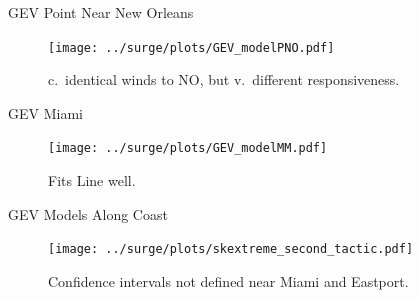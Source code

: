 \begin{frame}{GEV Point Near New Orleans}
\vspace{-20pt}
 \begin{minipage}{1.0\textwidth}
\begin{figure}[htb!]
    \centering
    \texttt{[image: ../surge/plots/GEV\_modelPNO.pdf]}
    \vspace{-25pt}
   \caption{c.\ identical winds to NO, but v.\ different
     responsiveness. }
\end{figure}
\end{minipage}
\end{frame}

\begin{frame}{GEV Miami}
\vspace{-20pt}
 \begin{minipage}{1.0\textwidth}
\begin{figure}[htb!]
    \centering
    \texttt{[image: ../surge/plots/GEV\_modelMM.pdf]}
    \vspace{-25pt}
   \caption{Fits Line well.}
\end{figure}
\end{minipage}
\end{frame}

\begin{frame}{GEV Models Along Coast}
\vspace{-20pt}
 \begin{minipage}{1.0\textwidth}
\begin{figure}[htb!]
    \centering
    \texttt{[image: ../surge/plots/skextreme\_second\_tactic.pdf]}
    \vspace{-15pt}
   \caption{Confidence intervals not defined near Miami and Eastport. }
\end{figure}
\end{minipage}
\end{frame}



